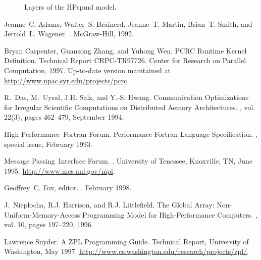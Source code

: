 \begin{figure}[tbp]
  \begin{center}
    \leavevmode
    \caption{Layers of the HPspmd model.}
    \label{fig:hpspmd}
  \end{center}
\end{figure}



%
%
%

%

\begin{thebibliography}{}

Jeanne~C. Adams, Walter~S. Brainerd, Jeanne~T. Martin, Brian~T. Smith, and
  Jerrold~L. Wagener.
.
\newblock McGraw-Hill, 1992.

Bryan Carpenter, Guansong Zhang, and Yuhong Wen.
 {PCRC} Runtime Kernel Definition.
\newblock Technical Report CRPC-TR97726. Center for Research on Parallel
  Computation, 1997.
\newblock Up-to-date version maintained at
  \url{http://www.npac.syr.edu/projects/pcrc}.

R.~Das, M.~Uysal, J.H. Salz, and Y.-S. Hwang.
\newblock Communication Optimizations for Irregular Scientific Computations on
  Distributed Aemory Architectures.
, vol. 22(3), pages 462--479,
  September 1994.

High Performance~Fortran Forum.
 {Performance} {Fortran} Language Specification.
, special issue, February 1993.

Message Passing~Interface Forum.
.
\newblock University of Tenessee, Knoxville, TN, June 1995.
\newblock \url{http://www.mcs.anl.gov/mpi}.

Geoffrey~C. Fox, editor.
. February 1998.

J.~Nieplocha, R.J. Harrison, and R.J. Littlefield.
\newblock The {Global Array}: Non-Uniform-Memory-Access Programming Model for
  High-Performance Computers.
, vol. 10, pages 197--220, 1996.

Lawrence Snyder.
\newblock A {ZPL} Programming Guide.
\newblock Technical Report, University of Washington, May 1997.
\newblock \url{http://www.cs.washington.edu/research/projects/zpl/}.


\end{thebibliography}

